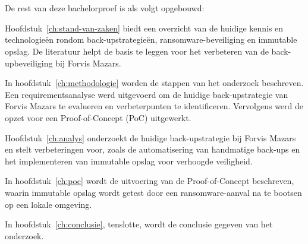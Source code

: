 \section{}%
\label{sec:opzet-bachelorproef}


De rest van deze bachelorproef is als volgt opgebouwd:

Hoofdstuk~\ref{ch:stand-van-zaken} biedt een overzicht van de huidige kennis en technologieën rondom back-upstrategieën, ransomware-beveiliging en immutable opslag. De literatuur helpt de basis te leggen voor het verbeteren van de back-upbeveiliging bij Forvis Mazars.

In hoofdstuk~\ref{ch:methodologie} worden de stappen van het onderzoek beschreven. Een requirementsanalyse werd uitgevoerd om de huidige back-upstrategie van Forvis Mazars te evalueren en verbeterpunten te identificeren. Vervolgens werd de opzet voor een Proof-of-Concept (PoC) uitgewerkt.

Hoofdstuk~\ref{ch:analys} onderzoekt de huidige back-upstrategie bij Forvis Mazars en stelt verbeteringen voor, zoals de automatisering van handmatige back-ups en het implementeren van immutable opslag voor verhoogde veiligheid.

In hoofdstuk~\ref{ch:poc} wordt de uitvoering van de Proof-of-Concept beschreven, waarin immutable opslag wordt getest door een ransomware-aanval na te bootsen op een lokale omgeving.

In hoofdstuk~\ref{ch:conclusie}, tenslotte, wordt de conclusie gegeven van het onderzoek.